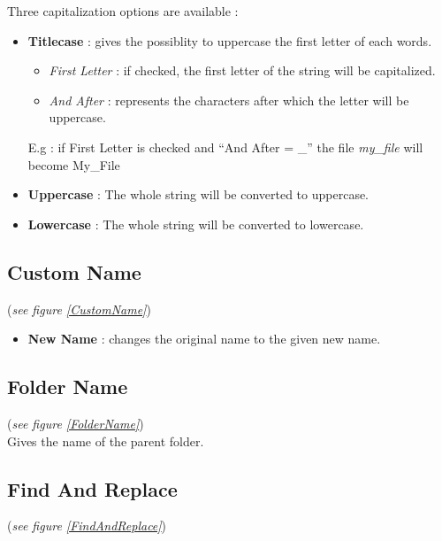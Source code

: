 \documentclass[11pt, a4paper]{scrartcl}
\begin{document}
Three capitalization options are available :
\begin{itemize}
        \item \textbf{Titlecase} : gives the possiblity to uppercase the first letter of each words.
                \begin{itemize}
                        \item \emph{First Letter} : if checked, the first letter of the string will be capitalized. 
                        \item \emph{And After} : represents the characters after which the letter will be uppercase. 
                \end{itemize}
                E.g : if First Letter is checked and ``And After = \_'' the file \emph{my\_file} will become My\_File
        \item \textbf{Uppercase} : The whole string will be converted to uppercase.
        \item \textbf{Lowercase} : The whole string will be converted to lowercase.
\end{itemize}

\subsection*{Custom Name}
(\emph{see figure \ref{CustomName}})\\

\begin{itemize}
        \item \textbf{New Name} : changes the original name to the given new name.
\end{itemize}

\subsection*{Folder Name}
(\emph{see figure \ref{FolderName}})\\

Gives the name of the parent folder.

\subsection*{Find And Replace}
(\emph{see figure \ref{FindAndReplace}})\\
\end{document}
